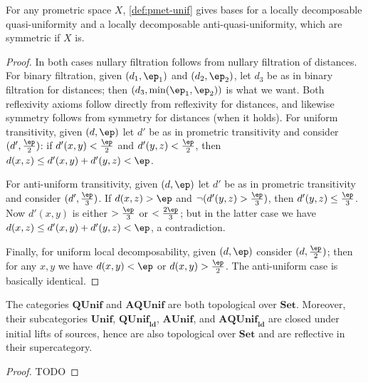 \documentclass{article}
\def\hfep{\frac{\ep}{2}}
\def\fep#1#2{\frac{\if1#1\else#1\fi\ep}{#2}}
\def\Set{\mathbf{Set}}
\def\QUnif{\mathbf{QUnif}}
\def\Unif{\mathbf{Unif}}
\def\ldQUnif{\mathbf{QUnif}_{\mathbf{ld}}}
\def\AUnif{\mathbf{AUnif}}
\def\AQUnif{\mathbf{AQUnif}}
\def\ldAQUnif{\mathbf{AQUnif}_{\mathbf{ld}}}
\begin{document}
\begin{thm}\label{thm:pmet-unif}
  For any prometric space $X$, \cref{def:pmet-unif} gives bases for a locally decomposable quasi-uniformity and a locally decomposable anti-quasi-uniformity, which are symmetric if $X$ is.
\end{thm}
\begin{proof}
  In both cases nullary filtration follows from nullary filtration of distances.
  For binary filtration, given $(d_1,\ep_1)$ and $(d_2,\ep_2)$, let $d_3$ be as in binary filtration for distances; then $(d_3,\min(\ep_1,\ep_2))$ is what we want.
  Both reflexivity axioms follow directly from reflexivity for distances, and likewise symmetry follows from symmetry for distances (when it holds).
  For uniform transitivity, given $(d,\ep)$ let $d'$ be as in prometric transitivity and consider $(d',\hfep)$: if $d'(x,y)<\hfep$ and $d'(y,z)<\hfep$, then $d(x,z) \le d'(x,y)+d'(y,z)<\ep$.

  For anti-uniform transitivity, given $(d,\ep)$ let $d'$ be as in prometric transitivity and consider $(d',\fep13)$.
  If $d(x,z)>\ep$ and $\neg (d'(y,z)>\fep13)$, then $d'(y,z)\le \fep13$.
  Now $d'(x,y)$ is either $>\fep13$ or $<\fep23$; but in the latter case we have $d(x,z) \le d'(x,y)+d'(y,z) < \ep$, a contradiction.

  Finally, for uniform local decomposability, given $(d,\ep)$ consider $(d,\hfep)$;
  then for any $x,y$ we have $d(x,y)<\ep$ or $d(x,y)>\hfep$.
  The anti-uniform case is basically identical.
\end{proof}

\begin{thm}
  The categories $\QUnif$ and $\AQUnif$ are both topological over $\Set$.
  Moreover, their subcategories $\Unif$, $\ldQUnif$, $\AUnif$, and $\ldAQUnif$ are closed under initial lifts of sources, hence are also topological over $\Set$ and are reflective in their supercategory.
\end{thm}
\begin{proof}
  TODO
\end{proof}
\end{document}
